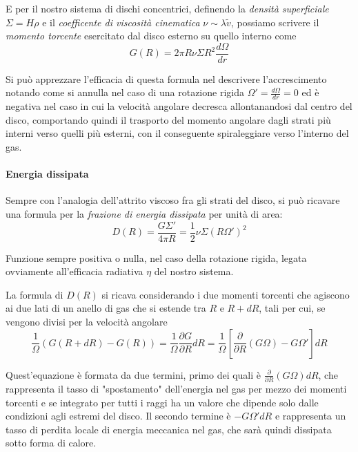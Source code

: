 \documentclass[a4paperbi]{article}
\begin{document}
	E per il nostro sistema di dischi concentrici, definendo la \textit{densità superficiale} $\Sigma=H\rho$ e il \textit{coefficente di viscosità cinematica} $\nu\sim\lambda\tilde{v}$, possiamo scrivere il \textit{momento torcente} esercitato dal disco esterno su quello interno come
	\begin{equation}
		G(R)=2\pi R\nu\Sigma R^2\frac{d\Omega}{dr}
	\end{equation}
	
	Si può apprezzare l'efficacia di questa formula nel descrivere l'accrescimento notando come si annulla nel caso di una rotazione rigida $\Omega'=\frac{d\Omega}{dr}=0$ ed è negativa nel caso in cui la velocità angolare decresca allontanandosi dal centro del disco, comportando quindi il trasporto del momento angolare dagli strati più interni verso quelli più esterni, con il conseguente spiraleggiare verso l'interno del gas.
		
	\paragraph{Energia dissipata}
	Sempre con l'analogia dell'attrito viscoso fra gli strati del disco, si può ricavare una formula per la \textit{frazione di energia dissipata} per unità di area:
	\begin{equation}
		D(R)=\frac{G\Sigma'}{4\pi R}=\frac{1}{2}\nu\Sigma(R\Omega')^2
	\end{equation}
	
	Funzione sempre positiva o nulla, nel caso della rotazione rigida, legata ovviamente all'efficacia radiativa $\eta$ del nostro sistema.
	
	La formula di $D(R)$ si ricava considerando i due momenti torcenti che agiscono ai due lati di un anello di gas che si estende tra $R$ e $R+dR$, tali per cui, se vengono divisi per la velocità angolare
	\begin{equation}
		\frac{1}{\Omega}(G(R+dR)-G(R))=\frac{1}{\Omega}\frac{\partial G}{\partial R}dR=\frac{1}{\Omega}\left[\frac{\partial}{\partial R}(G\Omega)-G\Omega'\right]dR
	\end{equation}
	
	Quest'equazione è formata da due termini, primo dei quali è $\frac{\partial}{\partial R}(G\Omega)dR$, che rappresenta il tasso di "spostamento" dell'energia nel gas per mezzo dei momenti torcenti e se integrato per tutti i raggi ha un valore che dipende solo dalle condizioni agli estremi del disco. Il secondo termine è $-G\Omega'dR$ e rappresenta un tasso di perdita locale di energia meccanica nel gas, che sarà quindi dissipata sotto forma di calore.
	
\end{document}
